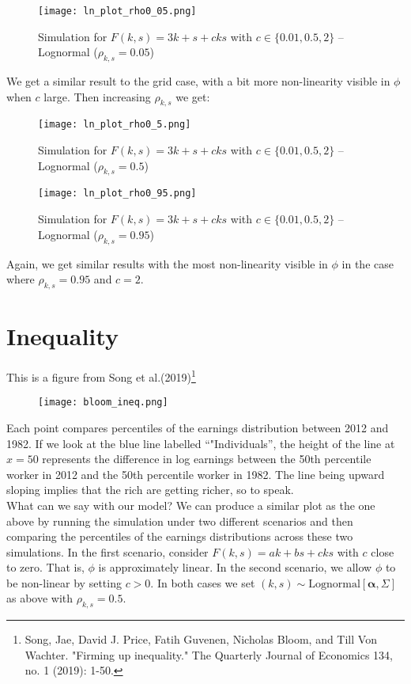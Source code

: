 \documentclass{article}
\begin{document}
	\begin{figure}[H]
		\centering
		\texttt{[image: ln\_plot\_rho0\_05.png]}
		\caption{Simulation for $F(k,s) = 3k + s + cks$ with $c\in\{0.01,0.5,2\}$ -- Lognormal ($\rho_{k,s}=0.05$)}
	\end{figure}
	
	We get a similar result to the grid case, with a bit more non-linearity visible in $\phi$ when $c$ large. Then increasing $\rho_{k,s}$ we get:
	
	\begin{figure}[H]
		\centering
		\texttt{[image: ln\_plot\_rho0\_5.png]}
		\caption{Simulation for $F(k,s) = 3k + s + cks$ with $c\in\{0.01,0.5,2\}$ -- Lognormal ($\rho_{k,s}=0.5$)}
	\end{figure}
	
	\begin{figure}[H]
		\centering
		\texttt{[image: ln\_plot\_rho0\_95.png]}
		\caption{Simulation for $F(k,s) = 3k + s + cks$ with $c\in\{0.01,0.5,2\}$ -- Lognormal ($\rho_{k,s}=0.95$)}
	\end{figure}
	
	Again, we get similar results with the most non-linearity visible in $\phi$ in the case where $\rho_{k,s} = 0.95$ and $c=2$. 
	
	\section{Inequality}
	
	This is a figure from Song et al.(2019)\footnote{Song, Jae, David J. Price, Fatih Guvenen, Nicholas Bloom, and Till Von Wachter. "Firming up inequality." The Quarterly Journal of Economics 134, no. 1 (2019): 1-50.}
	
	\begin{figure}[H]
		\centering
		\texttt{[image: bloom\_ineq.png]}
	\end{figure}
	
	Each point compares percentiles of the earnings distribution between 2012 and 1982. If we look at the blue line labelled ``"Individuals'', the height of the line at $x=50$ represents the difference in log earnings between the 50th percentile worker in 2012 and the 50th percentile worker in 1982. The line being upward sloping implies that the rich are getting richer, so to speak.\\
	
	What can we say with our model? We can produce a similar plot as the one above by running the simulation under two different scenarios and then comparing the percentiles of the earnings distributions across these two simulations. In the first scenario, consider $F(k,s) = ak + bs + cks$ with $c$ close to zero. That is, $\phi$ is approximately linear. In the second scenario, we allow $\phi$ to be non-linear by setting $c>0$. In both cases we set $(k,s) \sim \text{Lognormal}[\mathbf{\alpha},\Sigma]$ as above with $\rho_{k,s} = 0.5$.
	
\end{document}
